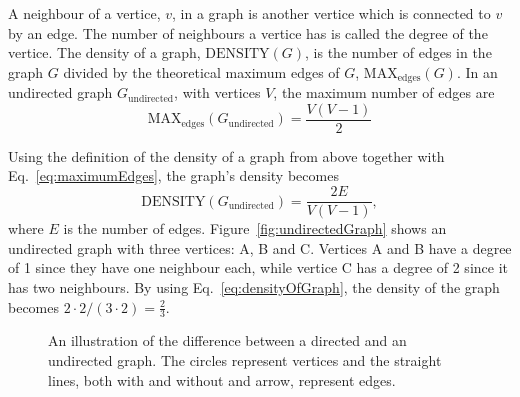 A neighbour of a vertice, $v$, in a graph is another vertice which is connected to $v$ by an edge. The number of neighbours a vertice has is called the degree of the vertice. The density of a graph, $\mathrm{DENSITY}(G)$, is the number of edges in the graph $G$ divided by the theoretical maximum edges of $G$, $\mathrm{MAX}_\mathrm{edges}(G)$. In an undirected graph $G_\mathrm{undirected}$, with vertices $V$, the maximum number of edges are
\begin{equation}\label{eq:maximumEdges}
\mathrm{MAX}_\mathrm{edges}(G_\mathrm{undirected}) = \frac{V  (V-1)}{2}
\end{equation}

Using the definition of the density of a graph from above together with Eq.~\eqref{eq:maximumEdges}, the graph's density becomes
\begin{equation}\label{eq:densityOfGraph}
\mathrm{DENSITY}(G_\mathrm{undirected}) = \frac{2 E}{V(V-1)},
\end{equation}
where $E$ is the number of edges. Figure~\ref{fig:undirectedGraph} shows an undirected graph with three vertices: A, B and C. Vertices A and B have a degree of 1 since they have one neighbour each, while vertice C has a degree of 2 since it has two neighbours. By using Eq.~\eqref{eq:densityOfGraph}, the density of the graph becomes $2\cdot2 / (3\cdot2) = \frac{2}{3}$.

\begin{figure}[htbp]
    \centering
    \qquad\qquad\qquad
    \caption[The difference between a directed and an undirected graph.]{An illustration of the difference between a directed and an undirected graph. The circles represent vertices and the straight lines, both with and without and arrow, represent edges.}
    \label{fig:graph}
\end{figure}

\acresetall
